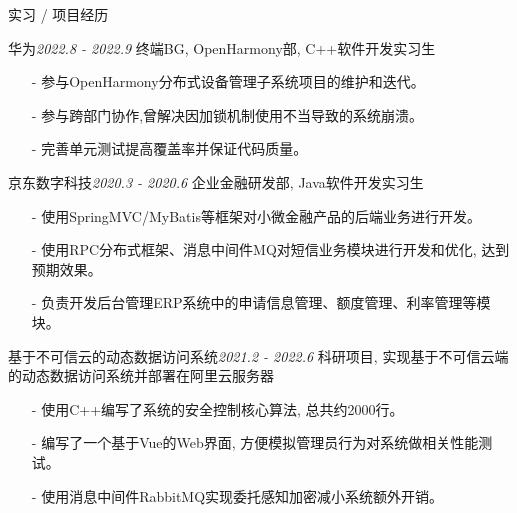 \documentclass{resume} %
\begin{document}

\begin{rSection}{实习 / 项目经历}

\begin{rSubsection}{华为}{\em 2022.8 - 2022.9}
{终端BG, OpenHarmony部, C++软件开发实习生}
{}
    \item[]
    \begin{itemize}
    \setlength\itemsep{-0.5em}
        \item[-] 参与OpenHarmony分布式设备管理子系统项目的维护和迭代。
        \item[-] 参与跨部门协作,曾解决因加锁机制使用不当导致的系统崩溃。
        \item[-] 完善单元测试提高覆盖率并保证代码质量。
    \end{itemize}
\end{rSubsection}

\begin{rSubsection}{京东数字科技}{\em 2020.3 - 2020.6}
{企业金融研发部, Java软件开发实习生}
{}
    \item[]
    \begin{itemize}
    \setlength\itemsep{-0.5em}
        \item[-] 使用SpringMVC/MyBatis等框架对小微金融产品的后端业务进行开发。
        \item[-] 使用RPC分布式框架、消息中间件MQ对短信业务模块进行开发和优化, 达到预期效果。
        \item[-] 负责开发后台管理ERP系统中的申请信息管理、额度管理、利率管理等模块。
    \end{itemize}
\end{rSubsection}


\begin{rSubsection}{基于不可信云的动态数据访问系统}{\em 2021.2 - 2022.6}
{科研项目, 实现基于不可信云端的动态数据访问系统并部署在阿里云服务器}
{}
    \item[]
    \begin{itemize}
    \setlength\itemsep{-0.5em}
        \item[-] 使用C++编写了系统的安全控制核心算法, 总共约2000行。
        \item[-] 编写了一个基于Vue的Web界面, 方便模拟管理员行为对系统做相关性能测试。
        \item[-] 使用消息中间件RabbitMQ实现委托感知加密减小系统额外开销。
    \end{itemize}
\end{rSubsection}


\end{rSection}
\end{document}

